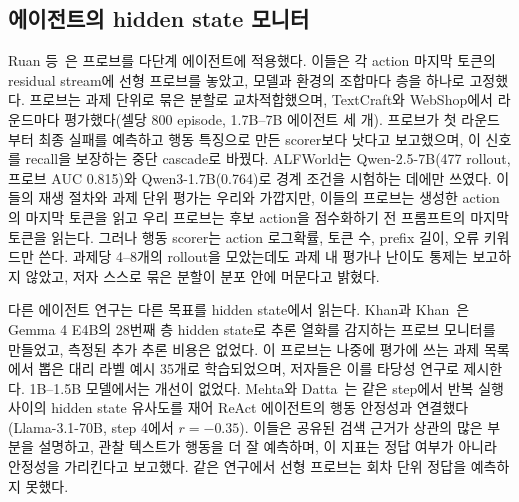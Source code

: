 \documentclass[11pt]{article}
\begin{document}
\subsection{에이전트의 hidden state 모니터}
Ruan 등~\cite{ruan2026doomed}은 프로브를 다단계 에이전트에 적용했다. 이들은 각 action 마지막 토큰의 residual stream에 선형 프로브를 놓았고, 모델과 환경의 조합마다 층을 하나로 고정했다.
프로브는 과제 단위로 묶은 분할로 교차적합했으며, TextCraft와 WebShop에서 라운드마다 평가했다(셀당 800 episode, 1.7B--7B 에이전트 세 개).
프로브가 첫 라운드부터 최종 실패를 예측하고 행동 특징으로 만든 scorer보다 낫다고 보고했으며, 이 신호를 recall을 보장하는 중단 cascade로 바꿨다.
ALFWorld는 Qwen-2.5-7B(477 rollout, 프로브 AUC 0.815)와 Qwen3-1.7B(0.764)로 경계 조건을 시험하는 데에만 쓰였다. 이들의 재생 절차와 과제 단위 평가는 우리와 가깝지만, 이들의 프로브는 생성한 action의 마지막 토큰을 읽고 우리 프로브는 후보 action을 점수화하기 전 프롬프트의 마지막 토큰을 읽는다.
그러나 행동 scorer는 action 로그확률, 토큰 수, prefix 길이, 오류 키워드만 쓴다. 과제당 4--8개의 rollout을 모았는데도 과제 내 평가나 난이도 통제는 보고하지 않았고, 저자 스스로 묶은 분할이 분포 안에 머문다고 밝혔다.

다른 에이전트 연구는 다른 목표를 hidden state에서 읽는다. Khan과 Khan~\cite{khan2026companion}은 Gemma 4 E4B의 28번째 층 hidden state로 추론 열화를 감지하는 프로브 모니터를 만들었고, 측정된 추가 추론 비용은 없었다.
이 프로브는 나중에 평가에 쓰는 과제 목록에서 뽑은 대리 라벨 예시 35개로 학습되었으며, 저자들은 이를 타당성 연구로 제시한다. 1B--1.5B 모델에서는 개선이 없었다.
Mehta와 Datta~\cite{mehta2026commit}는 같은 step에서 반복 실행 사이의 hidden state 유사도를 재어 ReAct 에이전트의 행동 안정성과 연결했다(Llama-3.1-70B, step 4에서 $r=-0.35$).
이들은 공유된 검색 근거가 상관의 많은 부분을 설명하고, 관찰 텍스트가 행동을 더 잘 예측하며, 이 지표는 정답 여부가 아니라 안정성을 가리킨다고 보고했다. 같은 연구에서 선형 프로브는 회차 단위 정답을 예측하지 못했다.
\end{document}
